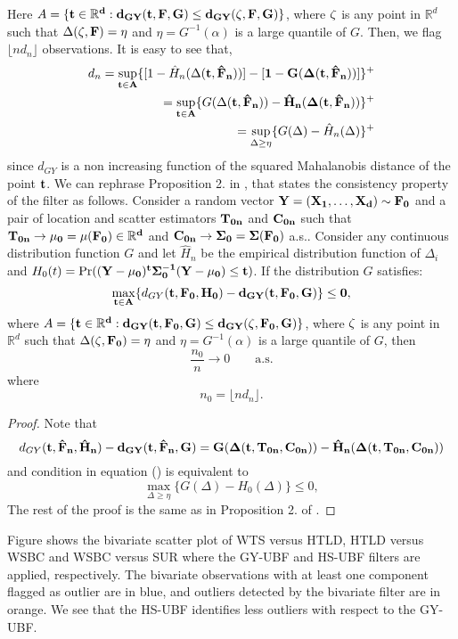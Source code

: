\documentclass[a4paper,12pt]{article}
\begin{document}
Here $A = \{ \bf{t} \in \mathbb{R}^d: d_{GY}(\bf{t}, F, G) \leq d_{GY}(\bf{\zeta}, F, G) \}$, where $\bf{\zeta}$ is any point in $\mathbb{R}^d$ such that $\Delta(\bf{\zeta}, F)  = \eta$ and $\eta = G^{-1}(\alpha)$ is a large quantile of $G$. Then, we flag $\lfloor nd_{n} \rfloor$ observations. It is easy to see that,
\begin{align*}
d_n  = \sup_{\bf{t} \in A} \{ [1 - \hat{H}_n(\Delta(\bf{t}, \hat{F}_n))] - [1 - G(\Delta(\bf{t}, \hat{F}_n))] \}^+ \\
 =  \sup_{\bf{t} \in A} \{ G(\Delta(\bf{t}, \hat{F}_n)) - \hat{H}_n(\Delta(\bf{t}, \hat{F}_n)) \}^+ \\
 = \sup_{\Delta \ge \eta} \{ G(\Delta) - \hat{H}_n(\Delta) \}^+
\end{align*}
since $d_{GY}$ is a non increasing function of the squared Mahalanobis distance of the point $\bf{t}$.
We can rephrase Proposition 2. in \citet{Zamar2017}, that states the consistency property of the filter as follows.
Consider a random vector $\bf{Y} = (X_{1}, \ldots, X_{d}) \sim F_0$ and a pair of location and scatter estimators $\bf{T}_{0n}$ and $\bf{C}_{0n}$ such that $\bf{T}_{0n} \rightarrow \bf{\mu}_0 = \bf{\mu}(F_0) \in \mathbb{R}^d$ and $\bf{C}_{0n} \rightarrow \bf{\Sigma}_0 = \bf{\Sigma}(F_0)$ a.s.. Consider any continuous distribution function $G$ and let $\hat{H}_n$ be the empirical distribution function of $\Delta_i$ and $H_0(t) = \Pr ((\bf{Y} - \bf{\mu}_0)^t \bf{\Sigma}_0^{-1}(\bf{Y} - \bf{\mu}_0) \le t )$. If the distribution $G$ satisfies: 
\begin{equation}
\max_{\bf{t} \in A} \{ d_{GY}(\bf{t},F_0,H_0) - d_{GY}(\bf{t},F_0,G) \} \le 0 ,
\end{equation}
where $A = \{ \bf{t} \in \mathbb{R}^d: d_{GY}(\bf{t}, F_0, G) \leq d_{GY}(\bf{\zeta}, F_0, G) \}$, where $\bf{\zeta}$ is any point in $\mathbb{R}^d$ such that $\Delta(\bf{\zeta}, F_0)  = \eta$ and $\eta = G^{-1}(\alpha)$ is a large quantile of $G$, then
\begin{equation*}
\frac{n_0}{n} \rightarrow 0 \qquad \text{a.s.}
\end{equation*}
where
\begin{equation*}
n_0 = \lfloor nd_{n} \rfloor .
\end{equation*}
\begin{proof}
Note that
\begin{equation*}
d_{GY}(\bf{t},\hat{F}_n,\hat{H}_n) - d_{GY}(\bf{t},\hat{F}_n, G) = G(\Delta(\bf{t},\bf{T}_{0n},\bf{C}_{0n})) - \hat{H}_n(\Delta(\bf{t},\bf{T}_{0n},\bf{C}_{0n})) 
\end{equation*}		
and condition in equation () is equivalent to 
\begin{equation*}
\max_{\Delta \ge \eta} \{G(\Delta) - H_0(\Delta) \} \le 0 ,
\end{equation*}
The rest of the proof is the same as in Proposition 2. of \citet{Zamar2017}.
\end{proof}
Figure  shows the bivariate scatter plot of WTS versus HTLD, HTLD versus WSBC and WSBC versus SUR where the GY-UBF and HS-UBF filters are applied, respectively. The bivariate observations with at least one component flagged as outlier are in blue, and outliers detected by the bivariate filter are in orange. We see that the HS-UBF identifies less outliers with respect to the GY-UBF.
\end{document}
